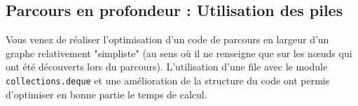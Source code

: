 \ifprof
\begin{corrige}
\begin{lstlisting}

\end{lstlisting}
\end{corrige}
\else
\fi

\ifprof
\begin{corrige}
\begin{lstlisting}

\end{lstlisting}
\end{corrige}
\else
\fi

\ifprof
\begin{corrige}
\begin{lstlisting}

\end{lstlisting}
\end{corrige}
\else
\fi

\subsection*{Parcours en profondeur : Utilisation des piles}

Vous venez de réaliser l'optimisation d'un code de parcours en largeur d'un graphe relativement "simpliste" (au sens où il ne renseigne que sur les n\oe{}uds qui ont été découverts lors du parcours). L'utilisation d'une file avec le module \texttt{collections.deque} et une amélioration de la structure du code ont permis d'optimiser en bonne partie le temps de calcul.\\


\ifprof
\begin{corrige}
\begin{lstlisting}

\end{lstlisting}
\end{corrige}
\else
\fi

